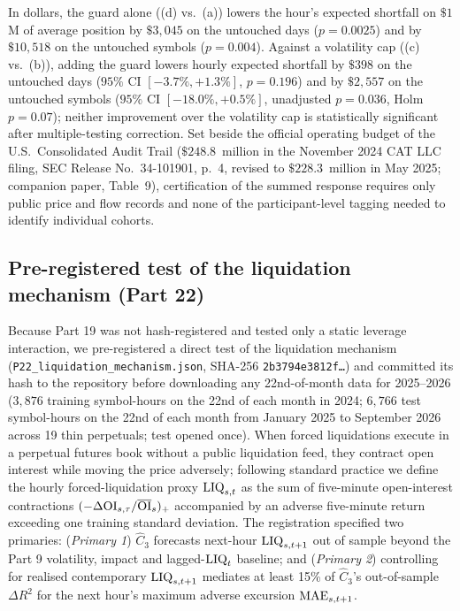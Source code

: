 \documentclass[12pt]{article}
\theoremstyle{definition}
\theoremstyle{remark}
\begin{document}
In dollars, the guard alone ((d) vs.\ (a)) lowers the hour's expected shortfall on $\$1$M of average position by $\$3{,}045$ on the untouched days ($p=0.0025$) and by $\$10{,}518$ on the untouched symbols ($p=0.004$). Against a volatility cap ((c) vs.\ (b)), adding the guard lowers hourly expected shortfall by $\$398$ on the untouched days ($95\%$ CI $[-3.7\%,+1.3\%]$, $p=0.196$) and by $\$2{,}557$ on the untouched symbols ($95\%$ CI $[-18.0\%,+0.5\%]$, unadjusted $p=0.036$, Holm $p=0.07$); neither improvement over the volatility cap is statistically significant after multiple-testing correction. Set beside the official operating budget of the U.S.\ Consolidated Audit Trail ($\$248.8$~million in the November 2024 CAT LLC filing, SEC Release No.\ 34-101901, p.~4, revised to $\$228.3$~million in May 2025; companion paper, Table~9), certification of the summed response requires only public price and flow records and none of the participant-level tagging needed to identify individual cohorts.

\subsection{Pre-registered test of the liquidation mechanism (Part 22)}\label{sec:p22}
Because Part 19 was not hash-registered and tested only a static leverage interaction, we pre-registered a direct test of the liquidation mechanism (\texttt{P22\_liquidation\_mechanism.json}, SHA-256 \texttt{2b3794e3812f\ldots}) and committed its hash to the repository before downloading any 22nd-of-month data for 2025--2026 ($3{,}876$ training symbol-hours on the 22nd of each month in 2024; $6{,}766$ test symbol-hours on the 22nd of each month from January 2025 to September 2026 across 19 thin perpetuals; test opened once). When forced liquidations execute in a perpetual futures book without a public liquidation feed, they contract open interest while moving the price adversely; following standard practice we define the hourly forced-liquidation proxy ${\rm LIQ}_{s,t}$ as the sum of five-minute open-interest contractions $(-\Delta{\rm OI}_{s,\tau}/\overline{\rm OI}_s)_+$ accompanied by an adverse five-minute return exceeding one training standard deviation. The registration specified two primaries: (\emph{Primary 1}) $\hat C_3$ forecasts next-hour ${\rm LIQ}_{s,t+1}$ out of sample beyond the Part 9 volatility, impact and lagged-${\rm LIQ}_t$ baseline; and (\emph{Primary 2}) controlling for realised contemporary ${\rm LIQ}_{s,t+1}$ mediates at least 15\% of $\hat C_3$'s out-of-sample $\Delta R^2$ for the next hour's maximum adverse excursion ${\rm MAE}_{s,t+1}$.
\end{document}
